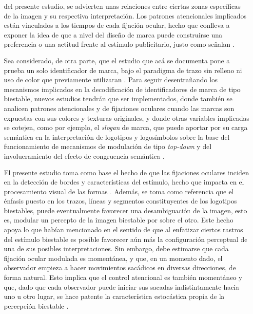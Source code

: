 \documentclass[spanish]{textolivre}
\begin{document}
del presente estudio, se advierten unas relaciones entre ciertas zonas específicas de la imagen y su respectiva interpretación. Los patrones atencionales implicados están vinculados a los tiempos de cada fijación ocular, hecho que conlleva a exponer la idea de que a nivel del diseño de marca puede construirse una preferencia o una actitud frente al estímulo publicitario, justo como señalan \textcite{ghosh_measuring_2013}.

Sea considerado, de otra parte, que el estudio que acá se documenta pone a prueba un solo identificador de marca, bajo el paradigma de trazo sin relleno ni uso de color que previamente utilizaran \textcite{groner_eye-movement_1983,marroquin-ciendua_modulacion_2020,rodriguez-martinez_can_2024}. Para seguir desentrañando los mecanismos implicados en la decodificación de identificadores de marca de tipo biestable, nuevos estudios tendrán que ser implementados, donde también se analicen patrones atencionales y de fijaciones oculares cuando las marcas son expuestas con sus colores y texturas originales, y donde otras variables implicadas se cotejen, como por ejemplo, el \textit{slogan} de marca, que puede aportar por su carga semántica en la interpretación de logotipos y logosímbolos sobre la base del funcionamiento de mecanismos de modulación de tipo \textit{top-down} y del involucramiento del efecto de congruencia semántica \cite{hsiao_assessing_2012,marroquin-ciendua_modulacion_2020,rodriguez-martinez_perceptual_2022}.

El presente estudio toma como base el hecho de que las fijaciones oculares inciden en la detección de bordes y características del estímulo, hecho que impacta en el procesamiento visual de las formas \cite{biederman_surface_1988,marroquin-ciendua_modulacion_2020}. Además, se toma como referencia que el énfasis puesto en los trazos, líneas y segmentos constituyentes de los logotipos biestables, puede eventualmente favorecer una desambiguación de la imagen, esto es, modular un percepto de la imagen biestable por sobre el otro. Este hecho apoya lo que \textcite{chastain_first_1975,groner_eye-movement_1983} habían mencionado en el sentido de que al enfatizar ciertos rastros del estímulo biestable es posible favorecer aún más la configuración perceptual de una de sus posibles interpretaciones. Sin embargo, debe estimarse que cada fijación ocular modulada es momentánea, y que, en un momento dado, el observador empieza a hacer movimientos sacádicos en diversas direcciones, de forma natural. Esto implica que el control atencional es también momentáneo y que, dado que cada observador puede iniciar sus sacadas indistintamente hacia uno u otro lugar, se hace patente la característica estocástica propia de la percepción biestable \cite{rodriguez-martinez_bistable_2018}.
\end{document}
